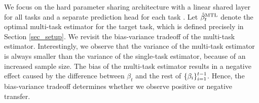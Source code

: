 We focus on the hard parameter sharing architecture with a linear shared layer for all tasks and a separate prediction head for each task \cite{R17,MTDNN19,WZR20}.
Let $\hat{\beta}_t^{\text{MTL}}$ denote the optimal multi-task estimator for the target task, which is defined precisely in Section \ref{sec_setup}.
We revisit the bias-variance tradeoff of the multi-task estimator.
Interestingly, we observe that the variance of the multi-task estimator is always smaller than the variance of the single-task estimator, because of an increased sample size.
The bias of the multi-task estimator results in a negative effect caused by the difference between $\beta_t$ and the rest of $\{\beta_i\}_{i=1}^{t-1}$.
Hence, the bias-variance tradeoff determines whether we observe positive or negative transfer.

